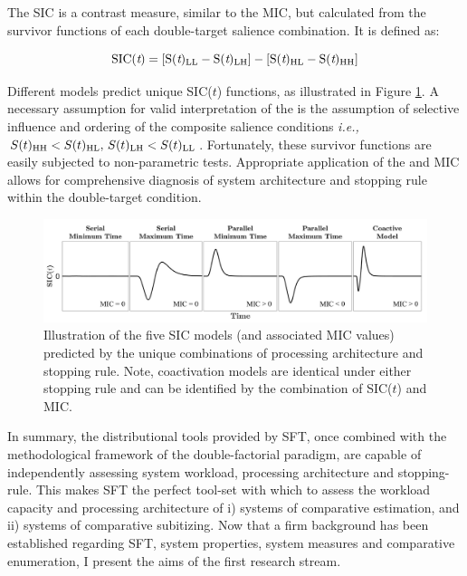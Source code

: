 The SIC is a contrast measure, similar to the MIC, but calculated from the survivor functions of each double-target salience combination. It is defined as:

\begin{equation}
	\rm SIC({\rm \textit{t}}) = \left[ S({\rm \textit{t}})_{LL} - S({\rm \textit{t}})_{LH} \right] - \left[ S({\rm \textit{t}})_{HL} - S({\rm \textit{t}})_{HH} \right]
    \label{eq:sic}
\end{equation}

\noindent
Different models predict unique SIC($t$) functions, as illustrated in Figure \ref{fig:SIC}. A necessary assumption for valid interpretation of the \SIC is the assumption of selective influence and ordering of the composite salience conditions \emph{i.e.,} $S(t)_{\rm HH} < S(t)_{\rm HL},\, S(t)_{\rm LH} < S(t)_{\rm LL}$. Fortunately, these survivor functions are easily subjected to non-parametric tests. Appropriate application of the \SIC and MIC allows for comprehensive diagnosis of system architecture and stopping rule within the double-target condition.

\begin{figure}[htb]
\centering \includegraphics[scale = .47]{Figures/Intro/SIC.pdf}
\caption{Illustration of the five SIC models (and associated MIC values) predicted by the unique combinations of processing architecture and stopping rule. Note, coactivation models are identical under either stopping rule and can be identified by the combination of SIC($t$) and MIC.}
\label{fig:SIC}
\end{figure}

In summary, the distributional tools provided by SFT, once combined with the methodological framework of the double-factorial paradigm, are capable of independently assessing system workload, processing architecture and stopping-rule. This makes SFT the perfect tool-set with which to assess the workload capacity and processing architecture of i) systems of comparative estimation, and ii) systems of comparative subitizing. Now that a firm background has been established regarding SFT, system properties, system measures and comparative enumeration, I present the aims of the first research stream.




